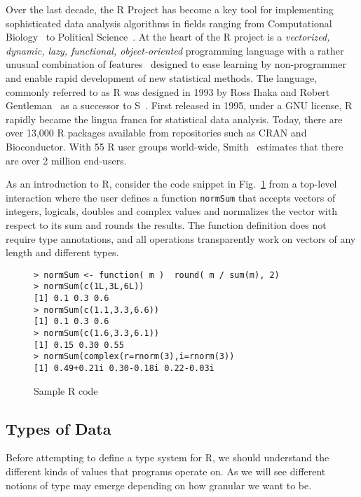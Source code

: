 \documentclass[acmsmall,10pt,review,anonymous]{acmart}\settopmatter{printfolios=true,printccs=false,printacmref=false}
\newcommand{\code}[1]{\lstinline|#1|\xspace}
\begin{document}
Over the last decade, the R Project has become a key tool for implementing
sophisticated data analysis algorithms in fields ranging from Computational
Biology~\cite{R05} to Political Science~\cite{R:Keele:2008}. At the heart of
the R project is a \emph{vectorized, dynamic, lazy, functional,
  object-oriented} programming language with a rather unusual combination of
features~\cite{ecoop12} designed to ease learning by non-programmer and
enable rapid development of new statistical methods.  The language, commonly
referred to as R was designed in 1993 by Ross Ihaka and Robert
Gentleman~\cite{R96} as a successor to S~\cite{S88}.  First released in
1995, under a GNU license, R rapidly became the lingua franca for
statistical data analysis. Today, there are over 13,000 R packages available
from repositories such as CRAN and Bioconductor.  With 55 R user groups
world-wide, Smith~\cite{eco11} estimates that there are over 2 million
end-users.


As an introduction to R, consider the code snippet in Fig.~\ref{sample} from
a top-level interaction where the user defines a function \code{normSum}
that accepts vectors of integers, logicals, doubles and complex values and
normalizes the vector with respect to its sum and rounds the results. The
function definition does not require type annotations, and all operations
transparently work on vectors of any length and different types.

\begin{figure}{\small
\begin{lstlisting}[style=R]
> normSum <- function( m )  round( m / sum(m), 2)
> normSum(c(1L,3L,6L))
[1] 0.1 0.3 0.6
> normSum(c(1.1,3.3,6.6))
[1] 0.1 0.3 0.6
> normSum(c(1.6,3.3,6.1))
[1] 0.15 0.30 0.55
> normSum(complex(r=rnorm(3),i=rnorm(3))
[1] 0.49+0.21i 0.30-0.18i 0.22-0.03i
\end{lstlisting}}
\caption{Sample R code}\label{sample}
\end{figure}

\subsection{Types of Data}

Before attempting to define a type system for R, we should understand the
different kinds of values that programs operate on.  As we will see
different notions of type may emerge depending on how granular we want to
be.
\end{document}

